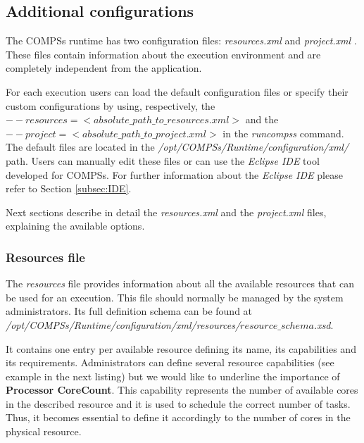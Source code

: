 \subsection{Additional configurations}

The COMPSs runtime has two configuration files: \textit{resources.xml} and \textit{project.xml} . 
These files contain information about the execution environment and are completely independent from the application.

For each execution users can load the default configuration files or specify their custom configurations 
by using, respectively, the \textit{$--resources=<absolute\_path\_to\_resources.xml>$} and the
\textit{$--project=<absolute\_path\_to\_project.xml>$} in the \textit{runcompss} command. The default files are located 
in the \emph{/opt/COMPSs/Runtime/configuration/xml/} path. 
Users can manually edit these files or can use the \textit{Eclipse IDE} tool developed for COMPSs. For further 
information about the \textit{Eclipse IDE} please refer to Section \ref{subsec:IDE}. 


Next sections describe in detail the \textit{resources.xml} and the \textit{project.xml} files, 
explaining the available options.

\subsubsection{Resources file}
The \textit{resources} file provides information about all the available resources that can be used for an execution. This file should normally be 
managed by the system administrators. Its full definition schema can be found at \\
\emph{/opt/COMPSs/Runtime/configuration/xml/resources/$resource\_schema$.xsd}.

It contains one entry per available resource defining its name, its capabilities and its requirements.
Administrators can define several resource capabilities (see example in the next listing) but we would like 
to underline the importance of \textbf{Processor CoreCount}. This capability represents the number of available cores 
in the described resource and it is used to schedule the correct number of tasks. Thus, it becomes essential to define 
it accordingly to the number of cores in the physical resource. 


